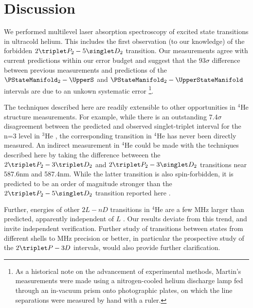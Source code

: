 \section{Discussion}

We performed multilevel laser absorption spectroscopy of excited state transitions in ultracold helium.
	This includes the first observation (to our knowledge) of the forbidden $2\triplet P_2 - 5\singlet D_2$ transition.
	Our measurements agree with current predictions within our error budget and suggest that the $93\sigma$ difference between previous measurements \cite{Martin60} and predictions \cite{Morton06} of the $\PStateManifold_2  -  \UpperS$ and $\PStateManifold_2  -  \UpperStateManifold$ intervals are due to an unkown systematic error \footnote{As a historical note on the advancement of experimental methods, Martin's measurements were made using a nitrogen-cooled helium discharge lamp fed through an in-vacuum prism onto photographic plates, on which the line separations were measured by hand with a ruler.}.
	

The techniques described here are readily extensible to other opportunities in $^4$He structure measurements.
	For example, while there is an outstanding 7.4$\sigma$ disagreement between the predicted and observed singlet-triplet interval for the n=3 level in $^3$He \cite{Morton06,Derouard80}, the corresponding transition in $^4$He has never been directly measured.
	An indirect measurement in $^4$He could be made with the techniques described here by taking the difference betweeen the $2\triplet P_2 - 3\triplet D_2$ and $2\triplet P_2 - 3\singlet D_2$ transitions near 587.6nm and 587.4nm.
	While the latter transition is also spin-forbidden, it is predicted to be an order of magnitude stronger than the $2\triplet P_2 - 5\singlet D_2$ transition reported here \cite{Morton06}.

{Further, energies of other $2L-nD$ transitions in $^4$He are a few MHz larger than predicted, apparently independent of $L$ \cite{Wienczek19,Yerokhin20}.
	Our results deviate from this trend, and invite independent verification.
	Further study of transitions between states from different shells to MHz precision or better, in particular the prospective study of the $2\triplet P - 3 D$ intervals, would also provide further clarification.}

